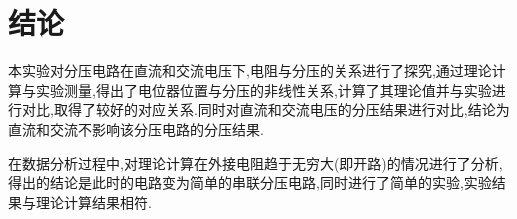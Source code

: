     \section{结论}
        本实验对分压电路在直流和交流电压下,电阻与分压的关系进行了探究,通过理论计算与实验测量,得出了电位器位置与分压的非线性关系,计算了其理论值并与实验进行对比,取得了较好的对应关系.同时对直流和交流电压的分压结果进行对比,结论为直流和交流不影响该分压电路的分压结果.

        在数据分析过程中,对理论计算在外接电阻趋于无穷大(即开路)的情况进行了分析,得出的结论是此时的电路变为简单的串联分压电路,同时进行了简单的实验,实验结果与理论计算结果相符.

